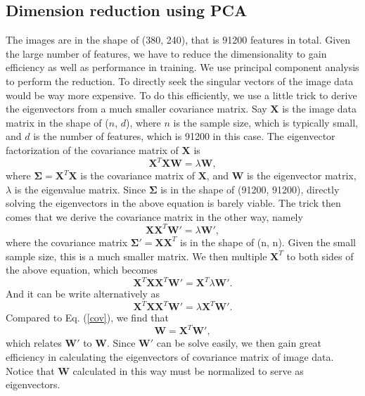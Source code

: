 \documentclass{article} %
\begin{document}
\subsection{Dimension reduction using PCA}
The images are in the shape of (380, 240), that is 91200 features in total.
Given the large number of features, we have to reduce the dimensionality to gain efficiency as well as performance in training. We use principal component analysis to perform the reduction. To directly seek the singular vectors of the image data would be way more expensive. To do this efficiently, we use a little trick to derive the eigenvectors from a much smaller covariance matrix. Say $\boldsymbol{X}$ is the image data matrix in the shape of ($n$, $d$), where $n$ is the sample size, which is typically small, and $d$ is the number of features, which is 91200 in this case. The eigenvector factorization of the covariance matrix of $\boldsymbol{X}$ is
\begin{equation}
   \label{cov}
	\boldsymbol{X}^{T}\boldsymbol{X} \boldsymbol{W} = \lambda \boldsymbol{W},
\end{equation}
where $\boldsymbol{\Sigma} = \boldsymbol{X}^{T}\boldsymbol{X}$ is the covariance matrix of $\boldsymbol{X}$, and $\boldsymbol{W}$ is the eigenvector matrix, $\lambda$ is the eigenvalue matrix. Since $\boldsymbol{\Sigma}$ is in the shape of (91200, 91200), directly solving the eigenvectors in the above equation is barely viable. The trick then comes that we derive the covariance matrix in the other way, namely
\begin{equation}
	\boldsymbol{X} \boldsymbol{X}^{T}\boldsymbol{W'} = \lambda \boldsymbol{W'},
\end{equation}
where the covariance matrix $\boldsymbol{\Sigma'} = \boldsymbol{X}\boldsymbol{X}^T$ is in the shape of (n, n). Given the small sample size, this is a much smaller matrix. We then multiple $\boldsymbol{X}^T$ to both sides of the above equation, which becomes
\begin{equation}
	\boldsymbol{X}^{T} \boldsymbol{X} \boldsymbol{X}^{T}\boldsymbol{W'} = \boldsymbol{X}^{T} \lambda \boldsymbol{W'}.
\end{equation}
And it can be write alternatively as
\begin{equation}
	\boldsymbol{X}^{T} \boldsymbol{X} \boldsymbol{X}^{T}\boldsymbol{W'} =  \lambda \boldsymbol{X}^{T}\boldsymbol{W'}.
\end{equation}
Compared to Eq. (\ref{cov}), we find that
\begin{equation}
	\boldsymbol{W} = \boldsymbol{X}^{T}\boldsymbol{W'},
\end{equation}
which relates $\boldsymbol{W'}$ to $\boldsymbol{W}$. Since $\boldsymbol{W'}$ can be solve easily, we then gain great efficiency in calculating the eigenvectors of covariance matrix of image data. Notice that $\boldsymbol{W}$ calculated in this way must be normalized to serve as eigenvectors.
\end{document}
